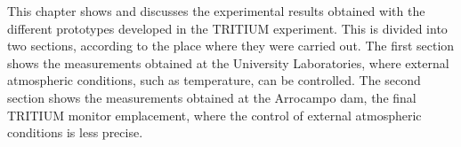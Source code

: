 This chapter shows and discusses the experimental results obtained with the different prototypes developed in the TRITIUM experiment. This is divided into two sections, according to the place where they were carried out. The first section shows the measurements obtained at the University Laboratories, where external atmospheric conditions, such as temperature, can be controlled. The second section shows the measurements obtained at the Arrocampo dam, the final TRITIUM monitor emplacement, where the control of external atmospheric conditions is less precise.


